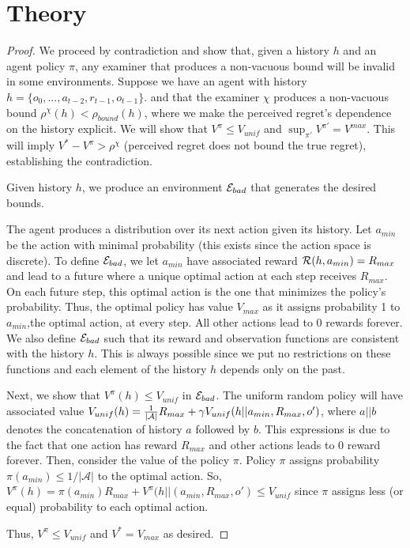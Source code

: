 
\section{Theory}
\label{app:theory}
\nofreelunch*


\begin{proof}
    We proceed by contradiction and show that, given a history $h$ and an agent policy $\pi$, any examiner that produces a non-vacuous bound will be invalid in some environments. 
    Suppose we have an agent with history $h=\{o_0, ..., a_{t-2}, r_{t-1}, o_{t-1}\}$.
    and that the examiner $\chi$ produces a non-vacuous bound $\rho^\chi(h) < \rho_{bound}(h)$, where we make the perceived regret's dependence on the history explicit. 
    We will show that $V^{\pi} \le V_{unif}$ and $\sup_{\pi'} V^{\pi'} = V^{max}$. This will imply $V^*- V^\pi > \rho^\chi $  (perceived regret does not bound the true regret), establishing the contradiction.

    Given history $h$, we produce an environment $\mathcal{E}_{bad}$ that generates the desired bounds. 
        
    The agent produces a distribution over its next action given its history. Let $a_{min}$ be the action with minimal probability (this exists since the action space is discrete).
    To define $\mathcal{E}_{bad}$,
    we let $a_{min}$ have associated reward $\mathcal{R}(h, a_{min}) = R_{max}$ and 
    lead to a future where a unique optimal action at each step receives $R_{max}$. On each future step, this optimal action is the one that minimizes the policy's probability. 
    Thus, the optimal policy has value $V_{max}$ as it assigns probability 1 to $a_{min}$,the optimal action, at every step. 
    All other actions lead to 0 rewards forever.
    We also define $\mathcal{E}_{bad}$ such that its reward  and observation functions are consistent with the history $h$. This is always possible since we put no restrictions on these functions and each element of the history $h$ depends only on the past. 

    Next, we show that $V^\pi(h) \le V_{unif}$ in $\mathcal{E}_{bad}$. 
    The uniform random policy will have associated value $V_{unif}(h)= \frac{1}{|\mathcal{A}|} {R_{max}} + \gamma V_{unif}(h || a_{min}, R_{max},o' )$, where $a || b$ denotes the concatenation of history $a$ followed by $b$. This expressions is due to the fact that one action has reward $R_{max}$ and other actions leads to 0 reward forever.
    Then, consider the value of the policy $\pi$. Policy $\pi$ assigns probability $\pi(a_{min}) \le 1/|\mathcal{A}|$ to the optimal action.
    So, $V^\pi(h) = \pi(a_{min})R_{max} + V^\pi(h||(a_{min}, R_{max}, o') \le V_{unif} $ since $\pi$ assigns less (or equal) probability to each optimal action. 

    Thus, $V^\pi \le V_{unif}$ and $V^* = V_{max}$ as desired.
    
\end{proof}



